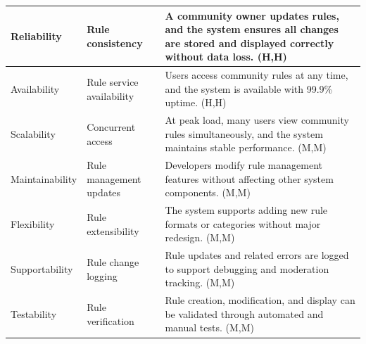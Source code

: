 \documentclass{article}
\begin{document}
\begin{table}[H]
\begin{tabular}{|p{3cm}|p{4cm}|p{7cm}|}
        Reliability
                                   & Rule consistency
                                   & A community owner updates rules, and the system ensures all changes are stored and displayed correctly without data loss. (H,H)                           \\
        \hline

        Availability
                                   & Rule service availability
                                   & Users access community rules at any time, and the system is available with 99.9\% uptime. (H,H)                                                           \\
        \hline

        Scalability
                                   & Concurrent access
                                   & At peak load, many users view community rules simultaneously, and the system maintains stable performance. (M,M)                                          \\
        \hline

        Maintainability
                                   & Rule management updates
                                   & Developers modify rule management features without affecting other system components. (M,M)                                                               \\
        \hline

        Flexibility
                                   & Rule extensibility
                                   & The system supports adding new rule formats or categories without major redesign. (M,M)                                                                   \\
        \hline

        Supportability
                                   & Rule change logging
                                   & Rule updates and related errors are logged to support debugging and moderation tracking. (M,M)                                                            \\
        \hline

        Testability
                                   & Rule verification
                                   & Rule creation, modification, and display can be validated through automated and manual tests. (M,M)                                                       \\
        \hline
    \end{tabular}
\end{table}
\end{document}
